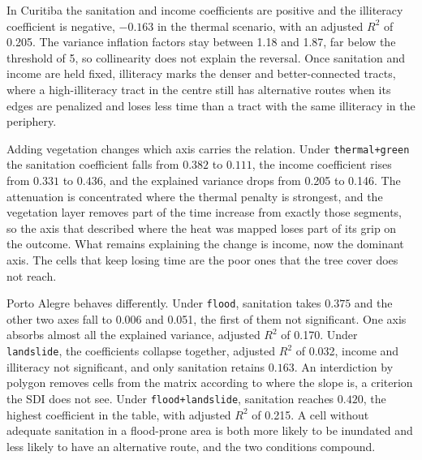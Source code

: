 In Curitiba the sanitation and income coefficients are positive and the illiteracy coefficient is negative, $-0.163$ in the thermal scenario, with an adjusted $R^2$ of 0.205. The variance inflation factors stay between 1.18 and 1.87, far below the threshold of 5, so collinearity does not explain the reversal. Once sanitation and income are held fixed, illiteracy marks the denser and better-connected tracts, where a high-illiteracy tract in the centre still has alternative routes when its edges are penalized and loses less time than a tract with the same illiteracy in the periphery.

Adding vegetation changes which axis carries the relation. Under \texttt{thermal+green} the sanitation coefficient falls from $0.382$ to $0.111$, the income coefficient rises from $0.331$ to $0.436$, and the explained variance drops from 0.205 to 0.146. The attenuation is concentrated where the thermal penalty is strongest, and the vegetation layer removes part of the time increase from exactly those segments, so the axis that described where the heat was mapped loses part of its grip on the outcome. What remains explaining the change is income, now the dominant axis. The cells that keep losing time are the poor ones that the tree cover does not reach.

Porto Alegre behaves differently. Under \texttt{flood}, sanitation takes $0.375$ and the other two axes fall to 0.006 and 0.051, the first of them not significant. One axis absorbs almost all the explained variance, adjusted $R^2$ of 0.170. Under \texttt{landslide}, the coefficients collapse together, adjusted $R^2$ of 0.032, income and illiteracy not significant, and only sanitation retains $0.163$. An interdiction by polygon removes cells from the matrix according to where the slope is, a criterion the SDI does not see. Under \texttt{flood+landslide}, sanitation reaches $0.420$, the highest coefficient in the table, with adjusted $R^2$ of 0.215. A cell without adequate sanitation in a flood-prone area is both more likely to be inundated and less likely to have an alternative route, and the two conditions compound.
